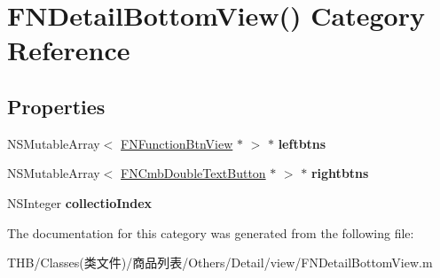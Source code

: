 \hypertarget{category_f_n_detail_bottom_view_07_08}{}\section{F\+N\+Detail\+Bottom\+View() Category Reference}
\label{category_f_n_detail_bottom_view_07_08}
\subsection*{Properties}
\begin{DoxyCompactItemize}
\item 
\mbox{\label{category_f_n_detail_bottom_view_07_08_aff6b0c9d09a787b9e185381c5cb8f3a4}} 
N\+S\+Mutable\+Array$<$ \mbox{\hyperlink{interface_f_n_function_btn_view}{F\+N\+Function\+Btn\+View}} $\ast$ $>$ $\ast$ {\bfseries leftbtns}
\item 
\mbox{\label{category_f_n_detail_bottom_view_07_08_a6058fc92a7166522126b77a1b4eecd26}} 
N\+S\+Mutable\+Array$<$ \mbox{\hyperlink{interface_f_n_cmb_double_text_button}{F\+N\+Cmb\+Double\+Text\+Button}} $\ast$ $>$ $\ast$ {\bfseries rightbtns}
\item 
\mbox{\label{category_f_n_detail_bottom_view_07_08_a4e6d1e91d332c97053b07e13cc6895cd}} 
N\+S\+Integer {\bfseries collectio\+Index}
\end{DoxyCompactItemize}


The documentation for this category was generated from the following file\+:\begin{DoxyCompactItemize}
\item 
T\+H\+B/\+Classes(类文件)/商品列表/\+Others/\+Detail/view/F\+N\+Detail\+Bottom\+View.\+m\end{DoxyCompactItemize}
